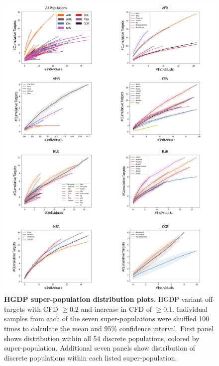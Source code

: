 \documentclass[a4paper, titlepage, openright]{book}
\begin{document}
\begin{figure}
	\label{fig:crisprme4}
\end{figure} 
\begin{figure}
	\centering
	\includegraphics[width=\textwidth]{figures/crisprme5.png}
	\caption[HGDP super-population distribution plots]{\textbf{HGDP super-population distribution plots.} HGDP variant off-targets with CFD $\geq 0.2$ and increase in CFD of $\geq 0.1$. Individual samples from each of the seven super-populations were shuffled 100 times to calculate the mean and 95\% confidence interval. First panel shows distribution within all 54 discrete populations, colored by super-population. Additional seven panels show distribution of discrete populations within each listed super-population.}
	\label{fig:crisprme5}
\end{figure} 
\end{document}
